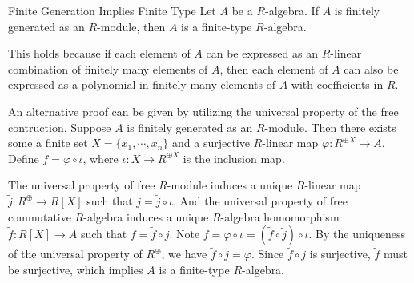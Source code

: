 \begin{proposition}{Finite Generation Implies Finite Type}{}
    Let $A$ be a $R$-algebra. If $A$ is finitely generated as an $R$-module, then $A$ is a finite-type $R$-algebra.
\end{proposition}

\begin{prf}
    This holds because if each element of $A$ can be expressed as an $R$-linear combination of finitely many elements of $A$, then each element of $A$ can also be expressed as a polynomial in finitely many elements of $A$ with coefficients in $R$.

    An alternative proof can be given by utilizing the universal property of the free contruction. Suppose $A$ is finitely generated as an $R$-module. Then there exists some a finite set $X=\{x_1,\cdots,x_n\}$ and a surjective $R$-linear map $\varphi:R^{\oplus X}\to A$. Define $f=\varphi\circ \iota$, where $\iota:X\to R^{\oplus X}$ is the inclusion map. 
     \begin{center}
    \end{center}
    The universal property of free $R$-module induces a unique $R$-linear map $\widetilde{j}:R^{\oplus}\to R[X]$ such that $j=\widetilde{j}\circ \iota$. And the universal property of free commutative $R$-algebra induces a unique $R$-algebra homomorphism $\widetilde{f}:R[X]\to A$ such that $f=\widetilde{f}\circ j$. Note $f=\varphi\circ \iota=\left(\widetilde{f}\circ \widetilde{j}\right)\circ \iota$. By the uniqueness of the universal property of $R^{\oplus}$, we have $\widetilde{f}\circ \widetilde{j}=\varphi$. Since $\widetilde{f}\circ \widetilde{j}$ is surjective, $\widetilde{f}$ must be surjective, which implies $A$ is a finite-type $R$-algebra.
\end{prf}
